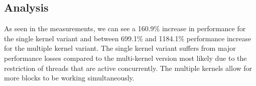 \documentclass[a4]{article}
\begin{document}
\subsection{Analysis}

As seen in the measurements, we can see a 160.9\% increase in performance for the single kernel variant and between 699.1\%
and 1184.1\% performance increase for the multiple kernel variant. The single kernel variant suffers from major performance 
losses compared to the multi-kernel version most likely due to the restriction of threads that are active concurrently. The
multiple kernels allow for more blocks to be working simultaneously.
\end{document}
